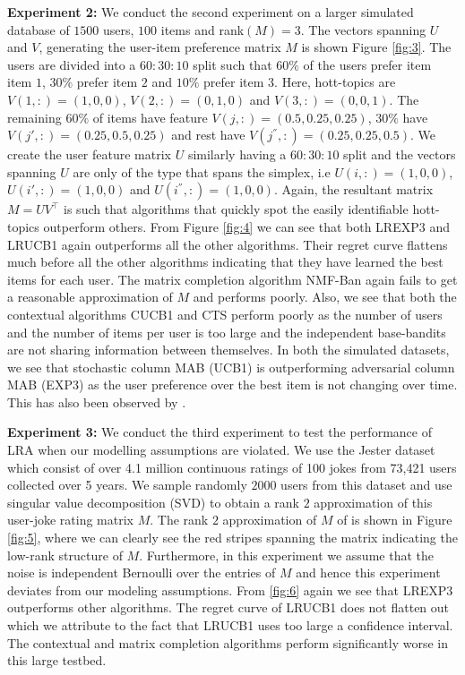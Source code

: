 \textbf{Experiment 2:} We conduct the second experiment on a larger simulated database of $1500$ users, $100$ items and rank$(M)=3$. The vectors spanning $U$ and $V$, generating the user-item preference matrix $M$ is shown Figure \ref{fig:3}. The users are divided into a $60:30:10$ split such that $60\%$ of the users prefer item item $1$, $30\%$ prefer item $2$ and $10\%$ prefer item $3$.  Here, hott-topics are $V(1,:) = (1,0,0)$, $V(2,:) = (0,1, 0)$ and $V(3,:) = (0,0,1)$. The remaining $60\%$ of items have feature  $V(j,:) = (0.5, 0.25,0.25)$, $30\%$ have $V(j',:) = (0.25, 0.5, 0.25)$ and rest have $V(j^{''},:) = (0.25, 0.25, 0.5)$. We create the user feature matrix $U$ similarly having a $60:30:10$ split and the vectors spanning $U$ are only of the type that spans the simplex, i.e $U(i,:)=(1,0,0)$, $U(i',:)=(1,0,0)$ and $U(i^{''},:)=(1,0,0)$. Again, the resultant matrix $M =UV^{\intercal}$ is such that algorithms that quickly spot the easily identifiable hott-topics outperform others. From Figure \ref{fig:4} we can see that both LREXP3 and LRUCB1 again outperforms all the other algorithms. Their regret curve flattens much before all the other algorithms indicating that they have learned the best items for each user. The matrix completion algorithm NMF-Ban again fails to get a reasonable approximation of $M$ and performs poorly. Also, we see that both the contextual algorithms CUCB1 and CTS perform poorly as the number of users and the number of items per user is too large and the independent base-bandits are not sharing information between themselves. In both the simulated datasets, we see that stochastic column MAB (UCB1) is outperforming adversarial column MAB (EXP3) as the user preference over the best item is not changing over time. This has also been observed by \citet{radlinski2008learning}.


\textbf{Experiment 3:} We conduct the third experiment to test the performance of LRA when our modelling assumptions are violated. We use the Jester dataset \citep{goldberg2001eigentaste} which consist of over 4.1 million continuous ratings of 100 jokes from 73,421 users collected over 5 years. We sample randomly $2000$ users from this dataset and use singular value decomposition (SVD) to obtain a rank $2$ approximation of this user-joke rating matrix $M$. The rank $2$ approximation of $M$ of  is shown in Figure \ref{fig:5}, where we can clearly see the red stripes spanning the matrix indicating the low-rank structure of $M$.  Furthermore, in this experiment we assume that the noise is independent Bernoulli over the entries of $M$ and hence this experiment deviates from our modeling assumptions. From \ref{fig:6} again we see that LREXP3 outperforms other algorithms. The regret curve of LRUCB1 does not flatten out which we attribute to the fact that LRUCB1 uses too large a confidence interval. The contextual and matrix completion algorithms perform significantly worse in this large testbed.



